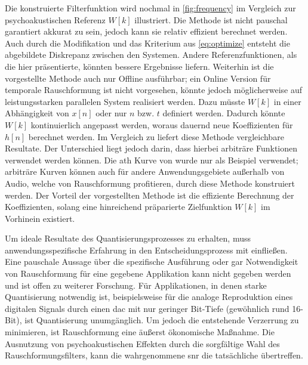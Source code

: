 Die konstruierte Filterfunktion wird nochmal in \autoref{fig:frequency} im Vergleich zur psychoakustischen Referenz $W[k]$ illustriert.
Die Methode ist nicht pauschal garantiert akkurat zu sein, jedoch kann sie relativ effizient berechnet werden.
Auch durch die Modifikation und das Kriterium aus \autoref{eq:optimize} entsteht die abgebildete Diskrepanz zwischen den Systemen.
Andere Referenzfunktionen, als die hier präsentierte, könnten bessere Ergebnisse liefern.
Weiterhin ist die vorgestellte Methode auch nur Offline ausführbar; ein Online Version für temporale Rauschformung ist nicht vorgesehen, könnte jedoch möglicherweise auf leistungsstarken parallelen System realisiert werden.
Dazu müsste $W[k]$ in einer Abhängigkeit von $x[n]$ oder nur $n$ bzw. $t$ definiert werden.
Dadurch könnte $W[k]$ kontinuierlich angepasst werden, woraus dauernd neue Koeffizienten für $h[n]$ berechnet werden.
Im Vergleich zu \citeauthor{noise-shaping} liefert diese Methode vergleichbare Resultate.
Der Unterschied liegt jedoch darin, dass hierbei arbiträre Funktionen verwendet werden können.
Die \gls{ath} Kurve von \citeauthor{iso226} wurde nur als Beispiel verwendet;
arbiträre Kurven können auch für andere Anwendungsgebiete außerhalb von Audio, welche von Rauschformung profitieren, durch diese Methode konstruiert werden.
Der Vorteil der vorgestellten Methode ist die effiziente Berechnung der Koeffizienten, solang eine hinreichend präparierte Zielfunktion $W[k]$ im Vorhinein existiert.

Um ideale Resultate des Quantisierungsprozesses zu erhalten, muss anwendungsspezifische Erfahrung in den Entscheidungsprozess mit einfließen.
Eine pauschale Aussage über die spezifische Ausführung oder gar Notwendigkeit von Rauschformung für eine gegebene Applikation kann nicht gegeben werden und ist offen zu weiterer Forschung.
Für Applikationen, in denen starke Quantisierung notwendig ist, beispielsweise für die analoge Reproduktion eines digitalen Signals durch einen \gls{dac} mit nur geringer Bit-Tiefe (gewöhnlich rund 16-Bit), ist Quantisierung unumgänglich.
Um jedoch die entstehende Verzerrung zu minimieren, ist Rauschformung eine äußerst ökonomische Maßnahme.
Die Ausnutzung von psychoakustischen Effekten durch die sorgfältige Wahl des Rauschformungsfilters, kann die wahrgenommene \gls{snr} die tatsächliche übertreffen.

